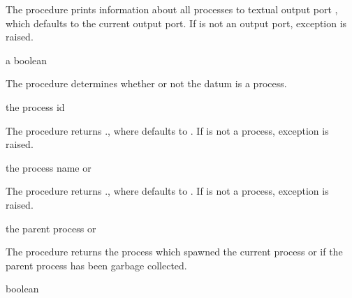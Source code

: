 The  procedure prints information about all processes to
textual output port , which defaults to the current output
port. If  is not an output port, exception  is raised.

\begin{procedure}
\end{procedure}
\returns{} a boolean

The  procedure determines whether or not the datum
 is a process.

\begin{procedure}
\end{procedure}
\returns{} the process id

The  procedure returns .,
where  defaults to . If  is not
a process, exception  is
raised.

\begin{procedure}
\end{procedure}
\returns{} the process name or 

The  procedure returns .,
where  defaults to . If  is not a
process, exception  is
raised.

\begin{procedure}
\end{procedure}
\returns{} the parent process or 

The  procedure returns the process which spawned
the current process or  if the parent process has been
garbage collected.

\begin{parameter}
\end{parameter}
\hasvalue{} boolean

